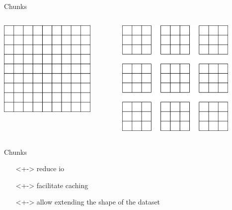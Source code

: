 \documentclass{beamer}
\begin{document}
\begin{frame}{Chunks}
  \begin{columns}[c]
    \begin{center}
      \includegraphics[width=0.8\textwidth]{images/contig-data.png}
    \end{center}

    \includegraphics[width=0.8\textwidth]{images/block-chunks.png}
  \end{columns}
\end{frame}

\begin{frame}{Chunks}
  \begin{itemize}
  \item[]<+-> reduce io
  \item[]<+-> facilitate caching
  \item[]<+-> allow extending the shape of the dataset
  \end{itemize}
\end{frame}
\end{document}
